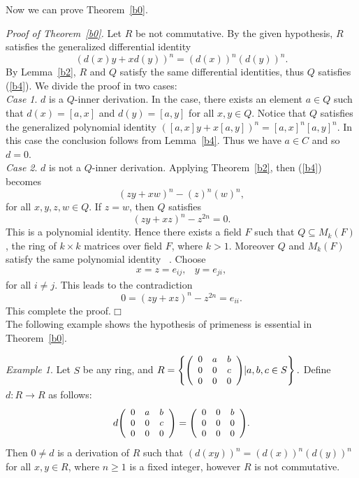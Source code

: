 \documentclass[12pt]{amsart}
\theoremstyle{definition}
\theoremstyle{remark}
\newtheorem{example}[thm]{Example}
\begin{document}
\smallskip
\noindent
 Now we can prove Theorem~\ref{b0}.

\vspace{3mm}
 \emph{Proof of Theorem~\ref{b0}.} Let $R$ be not commutative.
 By the given hypothesis, $R$ satisfies the generalized
 differential identity
 \begin{equation}\label{b4}
 (d(x)y+xd(y))^n=(d(x))^n(d(y))^n.
 \end{equation}
 By Lemma~\ref{b2}, $R$ and $Q$ satisfy the same differential
 identities, thus $Q$ satisfies (\ref{b4}).
 We divide the proof in two cases:\\

    \emph{Case 1}. $d$ is a $Q$-inner derivation.
  In the case, there exists an element $a\in Q$ such
  that $d(x)=[a,x]$ and $d(y)=[a,y]$ for all $x, y\in Q$.
  Notice that $Q$ satisfies the generalized polynomial identity
  $([a,x]y+x[a,y])^n=[a,x]^n[a,y]^n.$
  In this case the conclusion follows from Lemma~\ref{b4}.
  Thus we have $a\in C$ and so $d=0$.\\

 \emph{Case 2}. $d$ is not a $Q$-inner derivation. Applying
 Theorem~\ref{b2}, then (\ref{b4}) becomes
 $$(zy+xw)^n-(z)^n(w)^n,$$
 for all $x, y, z, w \in Q$. If $z=w$,
 then $Q$ satisfies
 $$(zy+xz)^n-z^{2n}=0.$$
 This is a polynomial identity. Hence there exists a field
 $F$ such that $Q\subseteq M_k(F)$, the ring of $k\times k$
 matrices over field $F$, where $k>1$.
 Moreover $Q$ and $M_k(F)$ satisfy the same polynomial identity
 ~\cite[Lemma 1]{a03}. Choose
 $$\begin{array}{cc}
   x=z=e_{ij}, & y=e_{ji},
 \end{array}$$
 for all $i\neq j$. This leads to the contradiction
 $$0=(zy+xz)^n-z^{2n}=e_{ii}.$$
 This complete the proof.\hfill $\Box$ \\
 

 \noindent
  The following example shows the hypothesis of primeness is essential in Theorem~\ref{b0}.
 \begin{example}
 Let $S$ be any ring, and
$R =\left\{{\small{\small{\small\left (
      \begin{array}{c c c}
        0 & a & b \\
        0 & 0 & c \\
        0 & 0 & 0
        \end{array} \right )}}}|a, b, c \in S \right\}.$
 Define $d:R\rightarrow R$ as follows:
$$d {\small{\small\left (
        \begin{array}{c c c}
        0 & a & b \\
        0 & 0 & c \\
        0 & 0 & 0
        \end{array} \right )}}=
 {\small{\small{\small\left (
        \begin{array}{c c c}
        0 & 0 & b \\
        0 & 0 & 0 \\
        0 & 0 & 0
        \end{array} \right )}}}.$$
 Then $0\neq d$ is a derivation of $R$ such that
 $(d(xy))^n=(d(x))^n(d(y))^n$ for all $x,y \in R$,
 where $n\geq 1$ is a fixed integer,
 however $R$ is  not commutative.
\end{example}
 
\end{document}

